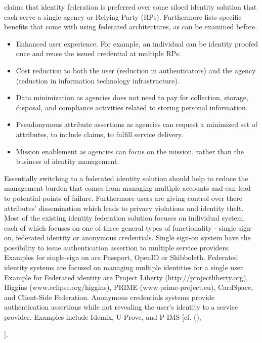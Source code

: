 {{	
	\cite{NIST:2017:DIG} claims that identity federation is preferred over some siloed identity solution that each serve a single agency or Relying Party (RPs). Furthermore \cite{NIST:2017:DIG} lists specific benefits that come with using federated architectures, as can be examined before. 
	
	\begin{itemize}
		\item Enhanced user experience. For example, an individual can be identity proofed once and reuse the issued credential at multiple RPs. 
		\item Cost reduction to both the user (reduction in authenticators) and the agency (reduction in information technology infrastructure). 
		\item Data minimization as agencies does not need to pay for collection, storage, disposal, and compliance activities related to storing personal information. 
		\item Pseudonymous attribute assertions as agencies can request a minimized set of attributes, to include claims, to fulfill service delivery. 
		\item Mission enablement as agencies can focus on the mission, rather than the business of identity management.
	\end{itemize}

 Essentially switching to a federated identity solution should help to reduce the management burden that comes from managing multiple accounts and can lead to potential points of failure.  Furthermore users are giving control over there attributes' dissemination which leads to privacy violations and identity theft. Most of the existing identity federation solution focuses on individual system, each of which focuses on one of three general types of functionality - single sign-on, federated identity or anonymous credentials. Single sign-on system have the possibility to issue authentication assertion to multiple service providers. Examples for single-sign on are Passport, OpenID or Shibboleth. Federated identity systems are focused on managing multiple identities for a single user. Example for Federated identity are Project Liberty (http://projectliberty.org), Higgins (www.eclipse.org/higgins), PRIME (www.prime-project.eu), CardSpace, and
Client-Side Federation. Anonymous credentials systems provide authentication assertions while not revealing the user's identity to a service provider. Examples include Idemix, U-Prove, and P-IMS [cf. (\cite{Birell:2013:FIMS}), {\cite{Boyed:2012:GSOA}].
	
}}}
